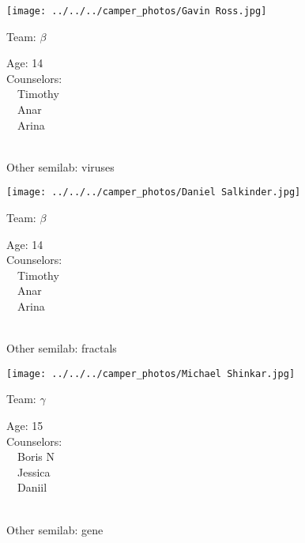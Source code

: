 \documentclass[10pt,letterpaper, landscape]{article}
\begin{document}
\horizontalshiftfornextsticker
\renewcommand{\baselinestretch}{1} \begin{sticker}
\noindent\begin{minipage}{0.5\textwidth}\texttt{[image: ../../../camper\_photos/Gavin Ross.jpg]}\end{minipage}\begin{minipage}{0.45\textwidth}
Team: {\Large $\beta$}

Age:        14\\
Counselors: \\\ \ Timothy\\\ \ Anar\\\ \ Arina\\
\end{minipage} \\ \vspace{0.07in}
Other semilab: viruses
\end{sticker}
\verticalshiftfornextsticker
\renewcommand{\baselinestretch}{1} \begin{sticker}
\noindent\begin{minipage}{0.5\textwidth}\texttt{[image: ../../../camper\_photos/Daniel Salkinder.jpg]}\end{minipage}\begin{minipage}{0.45\textwidth}
Team: {\Large $\beta$}

Age:        14\\
Counselors: \\\ \ Timothy\\\ \ Anar\\\ \ Arina\\
\end{minipage} \\ \vspace{0.07in}
Other semilab: fractals
\end{sticker}
\horizontalshiftfornextsticker
\renewcommand{\baselinestretch}{1} \begin{sticker}
\noindent\begin{minipage}{0.5\textwidth}\texttt{[image: ../../../camper\_photos/Michael Shinkar.jpg]}\end{minipage}\begin{minipage}{0.45\textwidth}
Team: {\Large $\gamma$}

Age:        15\\
Counselors: \\\ \ Boris N\\\ \ Jessica\\\ \ Daniil\\
\end{minipage} \\ \vspace{0.07in}
Other semilab: gene
\end{sticker}
\end{document}
